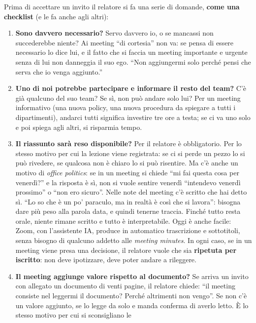 Prima di accettare un invito il relatore si fa una serie di domande, \textbf{come
una checklist} (e le fa anche agli altri):
\begin{enumerate}
  \item \textbf{Sono davvero necessario?} Servo davvero io, o se mancassi non
        succederebbe niente? Ai meeting ``di cortesia'' non va: se pensa di
        essere necessario lo dice lui, e il fatto che si faccia un meeting
        importante e urgente senza di lui non danneggia il suo ego. ``Non
        aggiungermi solo perché pensi che serva che io venga aggiunto.''
  \item \textbf{Uno di noi potrebbe partecipare e informare il resto del team?}
        C'è già qualcuno del suo team? Se sì, non può andare solo lui? Per un
        meeting informativo (una nuova policy, una nuova procedura da spiegare a
        tutti i dipartimenti), andarci tutti significa investire tre ore a
        testa; se ci va uno solo e poi spiega agli altri, si risparmia tempo.
  \item \textbf{Il riassunto sarà reso disponibile?} Per il relatore è
        obbligatorio. Per lo stesso motivo per cui la lezione viene
        registrata: se ci si perde un pezzo lo si può rivedere, se qualcosa non è
        chiaro lo si può risentire. Ma c'è anche un motivo di \emph{office
        politics}: se in un meeting si chiede ``mi fai questa cosa per venerdì?''
        e la risposta è sì, non si vuole sentire venerdì ``intendevo venerdì
        prossimo'' o ``non ero sicuro''. Nelle note del meeting c'è scritto che hai
        detto sì. ``Lo so che è un po' paraculo, ma in realtà è così che si
        lavora'': bisogna dare più peso alla parola data, e quindi tenerne
        traccia. Finché tutto resta orale, niente rimane scritto e tutto è
        interpretabile. Oggi è anche facile: Zoom, con l'assistente IA, produce
        in automatico trascrizione e sottotitoli, senza bisogno di qualcuno
        addetto alle \emph{meeting minutes}. In ogni caso, se in un meeting viene
        presa una decisione, il relatore vuole che sia \textbf{ripetuta per
        iscritto}: non deve ipotizzare, deve poter andare a rileggere.
  \item \textbf{Il meeting aggiunge valore rispetto al documento?} Se arriva un
        invito con allegato un documento di venti pagine, il relatore chiede: ``il
        meeting consiste nel leggermi il documento? Perché altrimenti non
        vengo''. Se non c'è un valore aggiunto, se lo legge da solo e manda
        conferma di averlo letto. È lo stesso motivo per cui si sconsigliano le

\end{enumerate}
